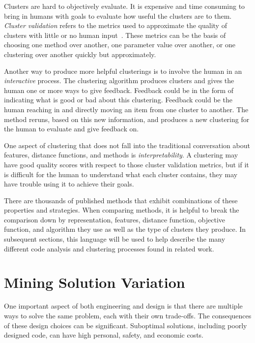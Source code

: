 Clusters are hard to objectively evaluate. It is expensive and time consuming to bring in humans with goals to evaluate how useful the clusters are to them. {\it Cluster validation} refers to the metrics used to approximate the quality of clusters with little or no human input~\cite{xu2005survey}. These metrics can be the basis of choosing one method over another, one parameter value over another, or one clustering over another quickly but approximately.

Another way to produce more helpful clusterings is to involve the human in an {\it interactive} process. The clustering algorithm produces clusters and gives the human one or more ways to give feedback. Feedback could be in the form of indicating what is good or bad about this clustering. Feedback could be the human reaching in and directly moving an item from one cluster to another. The method reruns, based on this new information, and produces a new clustering for the human to evaluate and give feedback on.

One aspect of clustering that does not fall into the traditional conversation about features, distance functions, and methods is {\it interpretability}. A clustering may have good quality scores with respect to those cluster validation metrics, but if it is difficult for the human to understand what each cluster contains, they may have trouble using it to achieve their goals.

There are thousands of published methods that exhibit combinations of these properties and strategies. When comparing methods, it is helpful to break the comparison down by representation, features, distance function, objective function, and algorithm they use as well as the type of clusters they produce. In subsequent sections, this language will be used to help describe the many different code analysis and clustering processes found in related work.


\section{Mining Solution Variation}

One important aspect of both engineering and design is that there are multiple ways to solve the same problem, each with their own trade-offs. The consequences of these design choices can be significant. Suboptimal solutions, including poorly designed code, can have high personal, safety, and economic costs. 

